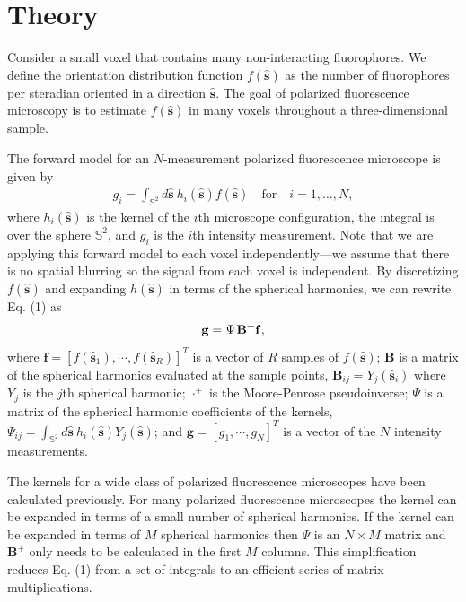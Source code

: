 \documentclass[letterpaper,10pt]{article}
\begin{document}
\section{Theory}
Consider a small voxel that contains many non-interacting fluorophores. We define the
orientation distribution function $f(\hat{\mathbf{s}})$ as the number of
fluorophores per steradian oriented in a direction $\hat{\mathbf{s}}$. The goal
of polarized fluorescence microscopy is to estimate $f(\hat{\mathbf{s}})$ in
many voxels throughout a three-dimensional sample.

The forward model for an $N$-measurement polarized fluorescence microscope is
given by
\begin{align}
  g_i = \int_{\mathbb{S}^2}d\hat{\mathbf{s}}\ h_i(\hat{\mathbf{s}})f(\hat{\mathbf{s}})\hspace{1em}\text{for}\hspace{1em} i=1,\dotsc,N,
\end{align}
where $h_i(\hat{\mathbf{s}})$ is the kernel of the $i$th microscope
configuration, the integral is over the sphere $\mathbb{S}^2$, and $g_i$ is the
$i$th intensity measurement. Note that we are applying this forward model to
each voxel independently---we assume that there is no spatial blurring so the
signal from each voxel is independent. By discretizing $f(\hat{\mathbf{s}})$ and
expanding $h(\hat{\mathbf{s}})$ in terms of the spherical harmonics, we can
rewrite Eq. (1) as
\begin{align}
  \mathbf{g} = \Psi\hspace{0.1em}\mathbf{B}^+\mathbf{f},
\end{align}
where $\mathbf{f} = [f(\hat{\mathbf{s}}_1), \cdots, f(\hat{\mathbf{s}}_R)]^T$ is
a vector of $R$ samples of $f(\hat{\mathbf{s}})$; $\mathbf{B}$ is a matrix of
the spherical harmonics evaluated at the sample points,
$\mathbf{B}_{ij} = Y_j(\hat{\mathbf{s}}_i)$ where $Y_j$ is the $j$th spherical
harmonic; $\cdot^+$ is the Moore-Penrose pseudoinverse; $\Psi$ is a matrix of
the spherical harmonic coefficients of the kernels,
$\Psi_{ij} = \int_{\mathbb{S}^2}d\hat{\textbf{s}}\
h_i(\hat{\mathbf{s}})Y_j(\hat{\mathbf{s}})$; and
$\mathbf{g} = [g_1, \cdots, g_N]^T$ is a vector of the $N$ intensity
measurements.

The kernels for a wide class of polarized fluorescence microscopes have been
calculated previously\cite{chandler}. For many polarized fluorescence
microscopes the kernel can be expanded in terms of a small number of spherical
harmonics. If the kernel can be expanded in terms of $M$ spherical harmonics
then $\Psi$ is an $N\times M$ matrix and $\mathbf{B}^+$ only needs to be
calculated in the first $M$ columns. This simplification reduces Eq. (1) from
a set of integrals to an efficient series of matrix multiplications.
\end{document}
